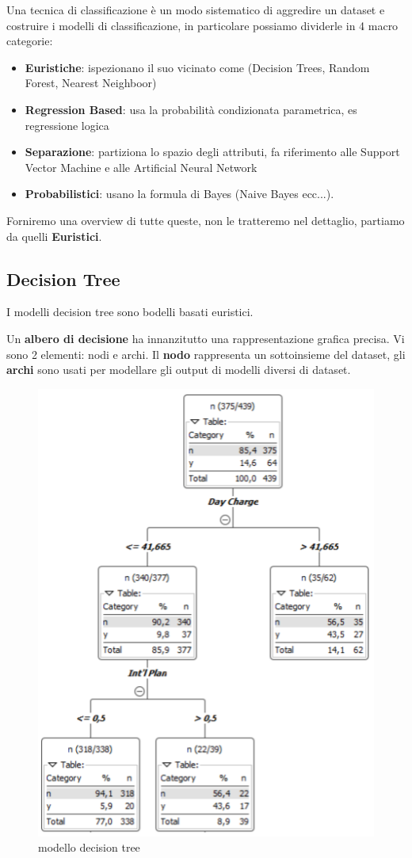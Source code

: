 Una tecnica di classificazione è un modo sistematico di aggredire un dataset e costruire i modelli di classificazione, in particolare possiamo dividerle in 4 macro categorie:
\begin{itemize}
	\item \textbf{Euristiche}: ispezionano il suo vicinato come (Decision Trees, Random Forest, Nearest Neighboor)
	\item \textbf{Regression Based}: usa la probabilità condizionata parametrica, es regressione logica
	\item \textbf{Separazione}: partiziona lo spazio degli attributi, fa riferimento alle Support Vector Machine e alle Artificial Neural Network
	\item \textbf{Probabilistici}: usano la formula di Bayes (Naive Bayes ecc...).
\end{itemize}

Forniremo una overview di tutte queste, non le tratteremo nel dettaglio, partiamo da quelli \textbf{Euristici}.

\subsection{Decision Tree}
I modelli decision tree sono bodelli basati euristici. 

Un \textbf{albero di decisione} ha innanzitutto una rappresentazione grafica precisa. Vi sono 2 elementi: nodi e archi. Il \textbf{nodo} rappresenta un sottoinsieme del dataset, gli \textbf{archi} sono usati per modellare gli output di modelli diversi di dataset.

\begin{figure}[H]
	\centering
	\includegraphics[height=0.7 \linewidth]{classification/pict/decision_tree.png}
	\caption{modello decision tree}
\end{figure}

